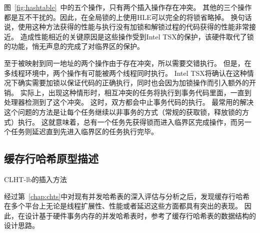 图~\ref{fig:hashtable}~中的五个操作，只有两个插入操作存在冲突。
其他的三个操作都是互不干扰的。因此，在全局锁的上使用HLE可以完全的将锁省略掉。
换句话说，使用这种方法获得的性能与执行没有加锁和解锁过程的代码获得的性能非常接近。
造成性能相近的关键原因是这些操作受到Intel TSX的保护，该硬件取代了锁的功能，悄无声息的完成了对临界区的保护。

至于被映射到同一地址的两个操作由于存在冲突，所以需要交错执行。
但是，在多线程环境中，两个操作有可能被两个线程同时执行。
Intel TSX将确认在这种情况下确实需要加锁以保证代码的正确执行，同时也会因为加锁操作而引入额外的开销。
实际上，出现这种情形时，相互冲突的任务将执行到事务代码里面，一直到处理器检测到了这个冲突。
这时，双方都会中止事务代码的执行。
最常用的解决这个问题的方法是让每个任务继续以非事务的方式（常规的获取锁，释放锁的方式）执行。
这就意味着，总有一个任务先获得锁而进入临界区完成操作，而另一个任务则延迟直到先进入临界区的任务执行完毕。


\subsection{缓存行哈希原型描述}

\begin{algorithm}[htbp]
\SetAlgoLined
{}%
%
\caption{CLHT-lb的插入方法}
\label{algo:clht-lb-insert}
\end{algorithm}

经过第~\ref{chap:chts}中对现有并发哈希表的深入评估与分析之后，发现缓存行哈希在多个平台上无论是线程扩展性、性能或者延迟这些方面都具有突出的表现。
因此，在设计基于硬件事务内存的并发哈希表时，参考了缓存行哈希表的数据结构的设计思路。


